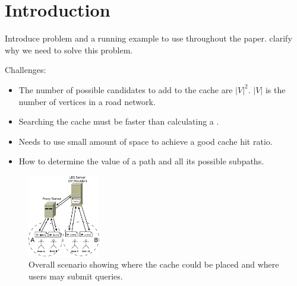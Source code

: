 \section{Introduction} \label{sec:intro}

Introduce problem and a running example to use throughout the paper. 
clarify why we need to solve this problem.

Challenges:
\begin{itemize}
\item The number of possible \spath candidates to add to the cache are $|V|^2$. $|V|$ is the number of vertices in a road network.
\item Searching the cache must be faster than calculating a \spathns.
\item Needs to use small amount of space to achieve a good cache hit ratio.
\item How to determine the value of a path and all its possible subpaths.
\end{itemize}


\begin{figure}
  \center
        \includegraphics[width=0.28\textwidth]{figures/scenario}
        \caption{Overall scenario showing where the cache could be placed and where users may submit \spath queries.}
  \label{fig:scenario}
\end{figure}